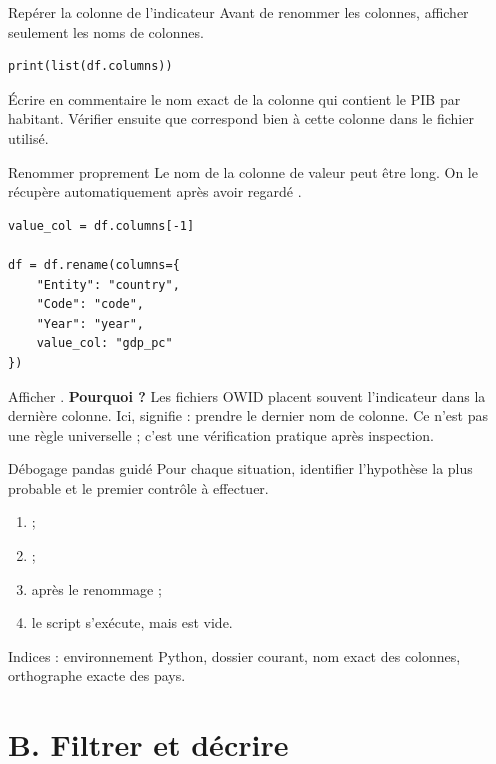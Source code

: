 \documentclass[11pt,a4paper]{article}
\begin{document}
\begin{mandatoryexercise}{Repérer la colonne de l'indicateur}
Avant de renommer les colonnes, afficher seulement les noms de colonnes.
\begin{lstlisting}
print(list(df.columns))
\end{lstlisting}
Écrire en commentaire le nom exact de la colonne qui contient le PIB par habitant. Vérifier ensuite que  correspond bien à cette colonne dans le fichier utilisé.
\end{mandatoryexercise}

\begin{mandatoryexercise}{Renommer proprement}
Le nom de la colonne de valeur peut être long. On le récupère automatiquement après avoir regardé .
\begin{lstlisting}
value_col = df.columns[-1]

df = df.rename(columns={
    "Entity": "country",
    "Code": "code",
    "Year": "year",
    value_col: "gdp_pc"
})
\end{lstlisting}
Afficher .
\textbf{Pourquoi  ?}
Les fichiers OWID placent souvent l'indicateur dans la dernière colonne. Ici,  signifie : prendre le dernier nom de colonne. Ce n'est pas une règle universelle ; c'est une vérification pratique après inspection.
\end{mandatoryexercise}

\begin{mandatoryexercise}{Débogage pandas guidé}
Pour chaque situation, identifier l'hypothèse la plus probable et le premier contrôle à effectuer.
\begin{enumerate}
  \item {} ;
  \item {} ;
  \item {} après le renommage ;
  \item le script s'exécute, mais  est vide.
\end{enumerate}
Indices : environnement Python, dossier courant, nom exact des colonnes, orthographe exacte des pays.
\end{mandatoryexercise}

\section*{B. Filtrer et décrire}
\end{document}
